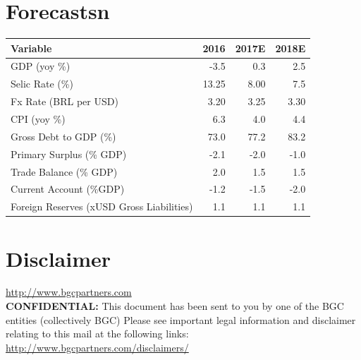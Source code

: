 \documentclass{report}
\begin{document}
\newpage




\section{Forecastsn}
\label{sec:org01e9a42}


\begin{center}
\begin{tabular}{lrrr}
\hline
\textbf{Variable} & \textbf{2016} & \textbf{2017E} & \textbf{2018E}\\
\hline
\hline
GDP (yoy \%) & -3.5 & 0.3 & 2.5\\
Selic Rate (\%) & 13.25 & 8.00 & 7.5\\
Fx Rate (BRL per USD) & 3.20 & 3.25 & 3.30\\
CPI (yoy \%) & 6.3 & 4.0 & 4.4\\
Gross Debt to GDP (\%) & 73.0 & 77.2 & 83.2\\
Primary Surplus (\% GDP) & -2.1 & -2.0 & -1.0\\
Trade Balance (\% GDP) & 2.0 & 1.5 & 1.5\\
Current Account (\%GDP) & -1.2 & -1.5 & -2.0\\
Foreign Reserves (xUSD Gross Liabilities) & 1.1 & 1.1 & 1.1\\
\hline
\end{tabular}
\end{center}

\newpage


\section{Disclaimer}
\label{sec:orgbeb03e1}
\url{http://www.bgcpartners.com} \\
\textbf{CONFIDENTIAL:} This document has been sent to you by one of
the BGC entities (collectively BGC) Please see important legal
information and disclaimer relating to this mail at the following
links: \url{http://www.bgcpartners.com/disclaimers/}
\end{document}
